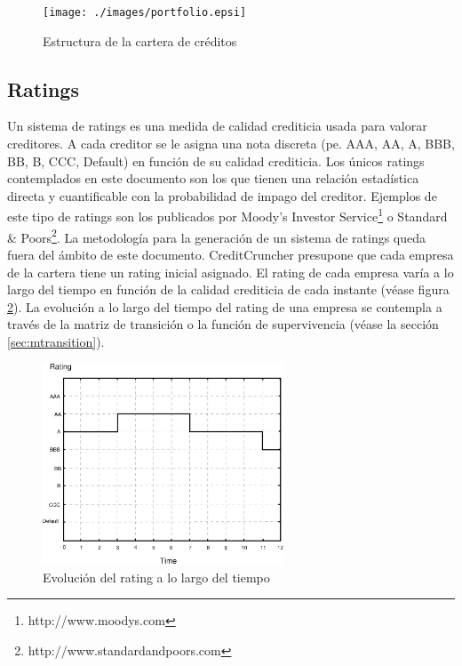 \begin{figure}[!hb]
\begin{center}
\texttt{[image: ./images/portfolio.epsi]}
\caption{Estructura de la cartera de cr\'editos}
\label{portfolio}
\end{center}
\end{figure}


\subsection{Ratings}

Un sistema de ratings es una medida de calidad crediticia usada para
valorar creditores. A cada creditor se le asigna una nota discreta (pe. AAA,
AA, A, BBB, BB, B, CCC, Default) en funci\'on de su calidad
crediticia. Los \'unicos ratings contemplados en este documento 
son los que tienen una relaci\'on estad\'istica directa y cuantificable 
con la probabilidad de impago del creditor. Ejemplos de este tipo de ratings 
son los publicados por Moody's Investor Service\footnote{http://www.moodys.com} 
o Standard \& Poors\footnote{http://www.standardandpoors.com}. 
\newline
\newline
La metodolog\'ia para la generaci\'on de un sistema de ratings queda fuera del
\'ambito de este documento. CreditCruncher presupone que cada empresa de la 
cartera tiene un rating inicial asignado.
\newline
\newline
El rating de cada empresa var\'ia a lo largo del tiempo en funci\'on de la 
calidad crediticia de cada instante (v\'ease figura \ref{ratingevol}). 
La evoluci\'on a lo largo del tiempo del rating de una empresa se 
contempla a trav\'es de la matriz de transici\'on o la funci\'on de 
supervivencia (v\'ease la secci\'on \ref{sec:mtransition}).
\begin{figure}[!hb]
\begin{center}
\includegraphics[height=6cm, angle=0]{./images/ratingevol.eps}
\caption{Evoluci\'on del rating a lo largo del tiempo}
\label{ratingevol}
\end{center}
\end{figure}

